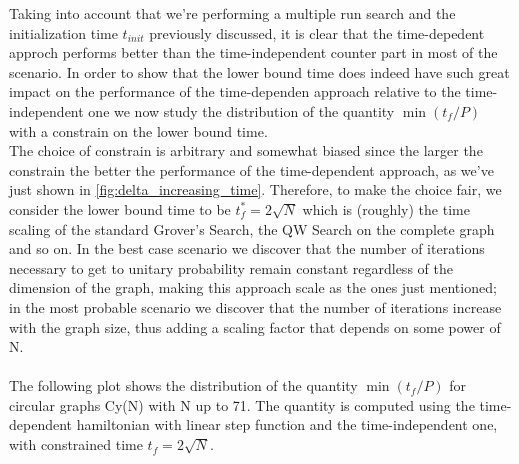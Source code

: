         Taking into account that we're performing a multiple run search and the initialization time $t_{init}$ previously discussed, it is clear that the time-depedent approch performs better than the time-independent counter part in most of the scenario.
        \clearpage
        In order to show that the lower bound time does indeed have such great impact on the performance of the time-dependen approach relative to the time-independent one we now study the distribution of the quantity $\min(t_f/P)$ with a constrain on the lower bound time. \\ The choice of constrain is arbitrary and somewhat biased since the larger the constrain the better the performance of the time-dependent approach, as we've just shown in \cref{fig:delta_increasing_time}. Therefore, to make the choice fair, we consider the lower bound time to be $t_f^* = 2\sqrt{N}$ which is (roughly) the time scaling of the standard Grover's Search, the QW Search on the complete graph and so on. In the best case scenario we discover that the number of iterations necessary to get to unitary probability remain constant regardless of the dimension of the graph, making this approach scale as the ones just mentioned; in the most probable scenario we discover that the number of iterations increase with the graph size, thus adding a scaling factor that depends on some power of N. \\ \\ The following plot shows the distribution of the quantity $\min(t_f/P)$ for circular graphs Cy(N) with N up to 71. The quantity is computed using the time-dependent hamiltonian with linear step function and the time-independent one, with constrained time $t_f=2 \sqrt{N}$.
